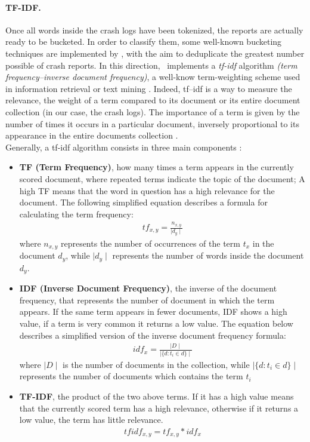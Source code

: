 \paragraph{TF-IDF.} 
Once all words inside the crash logs have been tokenized, the reports are actually ready to be bucketed.
In order to classify them, some well-known bucketing techniques are implemented by \toolname, with the aim to deduplicate the greatest number possible of crash reports.
In this direction, \toolname\ implements a \textit{tf-idf} algorithm \textit{(term frequency–inverse document frequency)}, a well-know term-weighting scheme used in information retrieval or text mining \cite{tfidf}. Indeed, tf–idf is a way to measure the relevance, the weight of a term compared to its document or its entire document collection (in our case, the crash logs). The importance of a term is given by the number of times it occurs in a particular document, inversely proportional to its appearance in the entire documents collection \cite{campbell}.  \\
Generally, a tf-idf algorithm consists in three main components \cite{tfidfsimilarity}: 
\begin{itemize}
\item \textbf{TF (Term Frequency)}, \ie how many times a term appears in the currently scored document, where repeated terms indicate the topic of the document; A high TF means that the word in question has a high relevance for the document. The following simplified equation \cite{tfidf} describes a formula for calculating the term frequency:
\begin{align*}
tf_{x,y} = \frac{n_{x,y}}{\mid d_{y} \mid}
\end{align*}
where $n_{x,y}$ represents the number of occurrences of the term $t_x$ in the document $d_{y}$, while $\mid d_{y} \mid$ represents the number of words inside the document $d_{y}$.

\item \textbf{IDF (Inverse Document Frequency)}, \ie the inverse of the document frequency, that represents the number of document in which the term appears. If the same term appears in fewer documents, IDF shows a high value, if a term is very common it returns a low value. 
The equation \cite{tfidf} below describes a simplified version of the inverse document frequency formula: 
\begin{align*}
idf_{x} = \frac{\mid D \mid}{\mid \{d: t_{i} \in d\} \mid}
\end{align*}
where $\mid D \mid$ is the number of documents in the collection, while $\mid \{d: t_{i} \in d\} \mid$ represents the number of documents which contains the term $t_i$

\item \textbf{TF-IDF}, \ie the product of the two above terms. If it has a high value means that the currently scored term has a high relevance, otherwise if it returns a low value, the term has little relevance.
\begin{align*}
tfidf_{x,y} = tf_{x,y}*idf_{x}
\end{align*}

\end{itemize}
